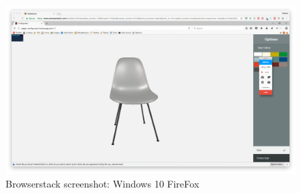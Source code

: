 \begin{figure}
\includegraphics[width=15cm]{images/deviceScreenshots/Windows10Firefox}
\caption{Browserstack screenshot: Windows 10 FireFox}
\label{attachment:Windows10Firefox}
\end{figure}

